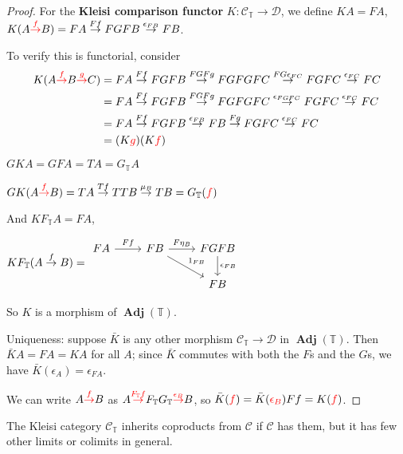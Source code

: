 \documentclass[a4paper]{article}
\numberwithin{definition}{section}
\DeclareMathOperator{\Adj}{\textbf{Adj}}
\begin{document}
\begin{proof}
	For the \textbf{Kleisi comparison functor} $K: \mathcal{C}_\mathbb{T} \to \mathcal{D}$,
	we define $KA=FA$,
	$K(A \textcolor{red}{\overset{f}{\to}} B) = FA \overset{Ff}{\to} FGFB \overset{\epsilon_{FB}}{\to} FB$.
	
	To verify this is functorial, consider
	\begin{align*}
		K(A \textcolor{red}{\overset{f}{\to}} B \textcolor{red}{\overset{g}{\to}} C) &=
			FA \overset{Ff}{\to} FGFB \overset{FGFg}{\to} FGFGFC \overset{FG\epsilon_{FC}}{\to} FGFC \overset{\epsilon_{FC}}{\to} FC \\
			&= FA \overset{Ff}{\to} FGFB \overset{FGFg}{\to} FGFGFC \overset{\epsilon_{FGFC}}{\to} FGFC \overset{\epsilon_{FC}}{\to} FC \\
			&= FA \overset{Ff}{\to} FGFB \overset{\epsilon_{FB}}{\to} FB \overset{Fg}{\to} FGFC \overset{\epsilon_{FC}}{\to} FC \\
			&= (K\textcolor{red}{g})(K\textcolor{red}{f})
	\end{align*}
	
	$GKA = GFA = TA = G_\mathbb{T}A$
	
	$GK(A \textcolor{red}{\overset{f}{\to}} B) = TA \overset{Tf}{\to} TTB \overset{\mu_B}{\to} TB = G_\mathbb{T}(\textcolor{red}{f})$
	
	And $KF_\mathbb{T}A = FA$,
	
	$KF_\mathbb{T}(A \overset{f}{\to} B) = \begin{tikzcd} FA \ar{r}{Ff} & FB \ar{r}{F\eta_B} \ar{rd}{1_{FB}} & FGFB \ar{d}{\epsilon_{FB}} \\ && FB\end{tikzcd}$
	
	So $K$ is a morphism of $\Adj(\mathbb{T})$.
	
	Uniqueness: suppose $\bar{K}$ is any other morphism $\mathcal{C}_\mathbb{T} \to \mathcal{D}$ in $\Adj(\mathbb{T})$.
	Then $\bar{K}A = FA = KA$ for all $A$;
	since $\bar{K}$ commutes with both the $F$s and the $G$s,
	we have $\bar{K}(\epsilon_A) = \epsilon_{FA}$.
	
	We can write $A \textcolor{red}{\overset{f}{\to}} B$ as
	$A \textcolor{red}{\overset{F_\mathbb{T}f}{\to}} F_\mathbb{T}G_\mathbb{T} \textcolor{red}{\overset{\epsilon_B}{\to}} B$,
	so $\bar{K}(\textcolor{red}{f}) = \bar{K}(\textcolor{red}{\epsilon_B})Ff=K(\textcolor{red}{f})$.
\end{proof}

The Kleisi category $\mathcal{C}_\mathbb{T}$ inherits coproducts from $\mathcal{C}$ if $\mathcal{C}$ has them,
but it has few other limits or colimits in general.
\end{document}
